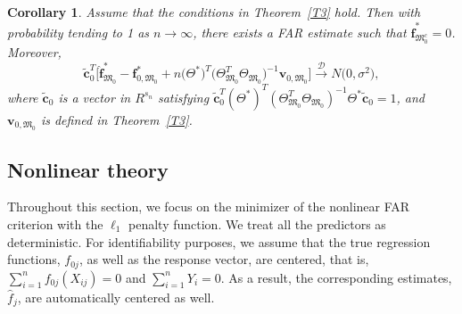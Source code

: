 \documentclass[aos,MSNbibl,dvips]{arximspdf}
\newcommand{\overset}{\stackrel}
\newtheorem{corollary}{Corollary}
\newcommand{\bc}{{\mathbf c}}
\newcommand{\bv}{{\mathbf v}}
\newcommand{\bff}{{\mathbf f}}
\newcommand{\hf}{\hat{\bff}}
\newcommand{\Mfrak}{\mathfrak{M}}
\newcommand{\hbff}{\hat{\bff}}
\def\toD{\overset{\mathscr{D}}{\longrightarrow}}
\begin{document}
\begin{corollary} Assume that the conditions in Theorem~\ref{T3} hold.
Then with probability tending to 1
as $n \rightarrow\infty$, there exists a FAR estimate such that
$\hbff_{\Mfrak_0^c}^* = 0$. Moreover,
%
\[
\tilde\bc^T_0\bigl[\hf_{\Mfrak_0}^* -
\bff_{0,\Mfrak_0}^* + n\bigl(\Theta^*\bigr)^T\bigl(
\Theta_{\Mfrak_0}^T\Theta_{\Mfrak_0}\bigr)^{-1}
\bv_{0,\Mfrak
_0}\bigr]\toD N\bigl(0, \sigma^2\bigr),
\]
%
where $\tilde\bc_0$ is a vector in $R^{s_n}$ satisfying $\tilde\bc
_0^T(\Theta^*)^T(\Theta_{\Mfrak_0}^T\Theta_{\Mfrak_0})^{-1}\Theta
^*\tilde\bc_0 = 1$, and $\bv_{0,\Mfrak_0}$
is defined in Theorem~\ref{T3}.
\end{corollary}

\subsection{Nonlinear theory}
\label{nonlintheorysec}

Throughout this section, we focus on the minimizer of the nonlinear
FAR criterion with the $\ell_1$ penalty function. We treat all the
predictors as deterministic. For identifiability purposes, we assume
that the true regression functions, $f_{0j}$, as well as the response
vector, are centered, that is, $\sum_{i=1}^n f_{0j}(X_{ij})=0$ and
$\sum_{i=1}^n Y_i=0$. As a result, the corresponding estimates,
$\hat f_j$, are automatically centered as well.
\end{document}

